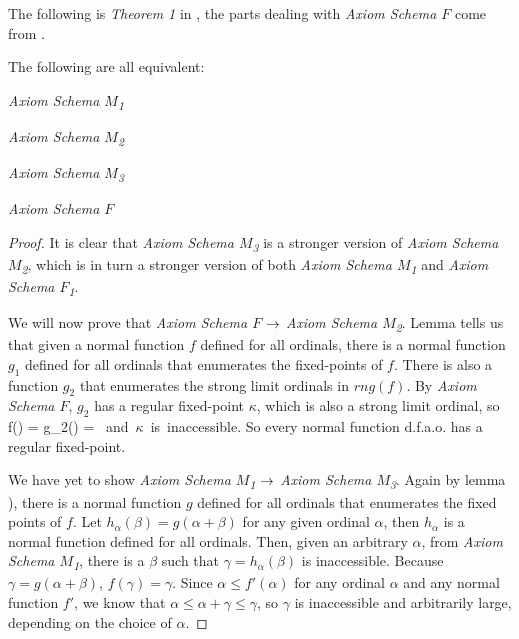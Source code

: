 The following is \emph{Theorem 1} in \cite{Levy60a}, the parts dealing with \emph{Axiom Schema $F$} come from \cite{DrakeBook}.

\begin{theorem}
The following are all equivalent:
\bce[(i)]
\item \emph{Axiom Schema $M$\textsubscript{1}}
\item \emph{Axiom Schema $M$\textsubscript{2}} 
\item \emph{Axiom Schema $M$\textsubscript{3}} 
\item \emph{Axiom Schema $F$}
\ece
\end{theorem}

\begin{proof}
It is clear that \emph{Axiom Schema $M$\textsubscript{3}} is a stronger version of \emph{Axiom Schema $M$\textsubscript{2}}, which is in turn a stronger version of both \emph{Axiom Schema $M$\textsubscript{1}} and \emph{Axiom Schema $F$\textsubscript{1}}. 

We will now prove that \emph{Axiom Schema $F$} $\rightarrow$ \emph{Axiom Schema $M$\textsubscript{2}}. 
Lemma  tells us that given a normal function $f$ defined for all ordinals, 
there is a normal function $g_1$ defined for all ordinals that enumerates the fixed-points of $f$. 
There is also a function $g_2$ that enumerates the strong limit ordinals in $rng(f)$. By \emph{Axiom Schema $F$}, $g_2$ has a regular fixed-point $\kappa$, which is also a strong limit ordinal, so 
\beq
f(\kappa) = g_2(\kappa) = \kappa \mbox{ and $\kappa$ is inaccessible.} 
\eeq
So every normal function d.f.a.o. has a regular fixed-point.

We have yet to show \emph{Axiom Schema $M$\textsubscript{1}} $\rightarrow$ \emph{Axiom Schema $M$\textsubscript{3}}. Again by lemma ), there is a normal function $g$ defined for all ordinals that enumerates the fixed points of $f$. Let $h_\alpha(\beta) = g(\alpha+\beta)$ for any given ordinal $\alpha$, then $h_\alpha$ is a normal function defined for all ordinals.
Then, given an arbitrary $\alpha$, from \emph{Axiom Schema $M$\textsubscript{1}}, there is a $\beta$ such that $\gamma = h_\alpha(\beta)$ is inaccessible. 
Because $\gamma = g(\alpha+\beta)$, $f(\gamma) = \gamma$. 
Since $\alpha \leq f'(\alpha)$ for any ordinal $\alpha$ and any normal function $f'$, we know that $\alpha \leq \alpha + \gamma \leq \gamma$, so $\gamma$ is inaccessible and arbitrarily large, depending on the choice of $\alpha$.
\end{proof}


